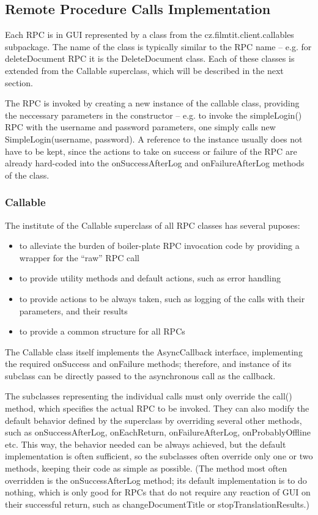 \subsection{Remote Procedure Calls Implementation}

Each RPC is in GUI represented by a class from the cz.filmtit.client.callables subpackage. The name of the class is typically similar to the RPC name -- e.g. for deleteDocument RPC it is the DeleteDocument class. Each of these classes is extended from the Callable superclass, which will be described in the next section.

The RPC is invoked by creating a new instance of the callable class, providing the neccessary parameters in the constructor -- e.g. to invoke the simpleLogin() RPC with the username and password parameters, one simply calls new SimpleLogin(username, password). A reference to the instance usually does not have to be kept, since the actions to take on success or failure of the RPC are already hard-coded into the onSuccessAfterLog and onFailureAfterLog methods of the class.

\subsubsection{Callable}

The institute of the Callable superclass of all RPC classes has several puposes:

\begin{itemize}
\item to alleviate the burden of boiler-plate RPC invocation code by providing a wrapper for the ``raw'' RPC call
\item to provide utility methods and default actions, such as error handling
\item to provide actions to be always taken, such as logging of the calls with their parameters, and their results
\item to provide a common structure for all RPCs
\end{itemize}

The Callable class itself implements the AsyncCallback interface, implementing the required onSuccess and onFailure methods; therefore, and instance of its subclass can be directly passed to the asynchronous call as the callback.

The subclasses representing the individual calls must only override the call() method, which specifies the actual RPC to be invoked.
They can also modify the default behavior defined by the superclass by overriding several other methods, such as onSuccessAfterLog, onEachReturn, onFailureAfterLog, onProbablyOffline etc. This way, the behavior needed can be always achieved, but the default implementation is often sufficient, so the subclasses often override only one or two methods, keeping their code as simple as possible. (The method most often overridden is the onSuccessAfterLog method; its default implementation is to do nothing, which is only good for RPCs that do not require any reaction of GUI on their successful return, such as changeDocumentTitle or stopTranslationResults.)


